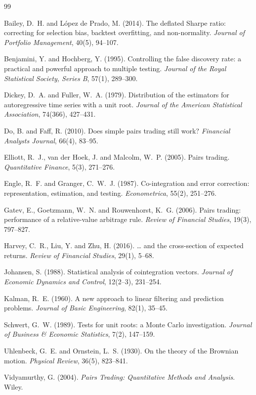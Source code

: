 \documentclass[11pt]{article}
\begin{document}
\begin{thebibliography}{99}

Bailey, D.~H. and L\'opez de Prado, M. (2014).
The deflated Sharpe ratio: correcting for selection bias, backtest overfitting, and
non-normality. \emph{Journal of Portfolio Management}, 40(5), 94--107.

Benjamini, Y. and Hochberg, Y. (1995).
Controlling the false discovery rate: a practical and powerful approach to multiple testing.
\emph{Journal of the Royal Statistical Society, Series B}, 57(1), 289--300.

Dickey, D.~A. and Fuller, W.~A. (1979).
Distribution of the estimators for autoregressive time series with a unit root.
\emph{Journal of the American Statistical Association}, 74(366), 427--431.

Do, B. and Faff, R. (2010).
Does simple pairs trading still work? \emph{Financial Analysts Journal}, 66(4), 83--95.

Elliott, R.~J., van der Hoek, J. and Malcolm, W.~P. (2005).
Pairs trading. \emph{Quantitative Finance}, 5(3), 271--276.

Engle, R.~F. and Granger, C.~W.~J. (1987).
Co-integration and error correction: representation, estimation, and testing.
\emph{Econometrica}, 55(2), 251--276.

Gatev, E., Goetzmann, W.~N. and Rouwenhorst, K.~G. (2006).
Pairs trading: performance of a relative-value arbitrage rule.
\emph{Review of Financial Studies}, 19(3), 797--827.

Harvey, C.~R., Liu, Y. and Zhu, H. (2016).
\ldots{} and the cross-section of expected returns.
\emph{Review of Financial Studies}, 29(1), 5--68.

Johansen, S. (1988).
Statistical analysis of cointegration vectors.
\emph{Journal of Economic Dynamics and Control}, 12(2--3), 231--254.

Kalman, R.~E. (1960).
A new approach to linear filtering and prediction problems.
\emph{Journal of Basic Engineering}, 82(1), 35--45.

Schwert, G.~W. (1989).
Tests for unit roots: a Monte Carlo investigation.
\emph{Journal of Business \& Economic Statistics}, 7(2), 147--159.

Uhlenbeck, G.~E. and Ornstein, L.~S. (1930).
On the theory of the Brownian motion. \emph{Physical Review}, 36(5), 823--841.

Vidyamurthy, G. (2004).
\emph{Pairs Trading: Quantitative Methods and Analysis}. Wiley.

\end{thebibliography}
\end{document}
